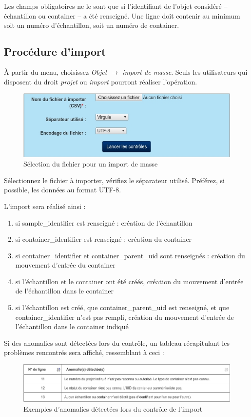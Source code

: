 Les champs obligatoires ne le sont que si l'identifiant de l'objet considéré -- échantillon ou container -- a été renseigné. Une ligne doit contenir au minimum soit un numéro d'échantillon, soit un numéro de container.

\subsection{Procédure d'import}

À partir du menu, choisissez \textit{Objet $\rightarrow$ import de masse}. Seuls les utilisateurs qui disposent du droit \textit{projet} ou \textit{import} pourront réaliser l'opération.
\begin{figure}[H]
\includegraphics[width=\linewidth]{images/import_controle}
\caption{Sélection du fichier pour un import de masse}
\end{figure}

Sélectionnez le fichier à importer, vérifiez le séparateur utilisé. Préférez, si possible, les données au format UTF-8.

L'import sera réalisé ainsi :
\begin{enumerate}

\item  si sample\_identifier est renseigné : création de l'échantillon
\item    si container\_identifier est renseigné : création du container
\item    si container\_identifier et container\_parent\_uid sont renseignés : création du mouvement d'entrée du container
\item    si l'échantillon et le container ont été créés, création du mouvement d'entrée de l'échantillon dans le container
\item    si l'échantillon est créé, que container\_parent\_uid est renseigné, et que container\_identifier n'est pas rempli, création du mouvement d'entrée de l'échantillon dans le container indiqué

\end{enumerate}

Si des anomalies sont détectées lors du contrôle, un tableau récapitulant les problèmes rencontrés sera affiché, ressemblant à ceci :
\begin{figure}[H]
\includegraphics[width=\linewidth]{images/import_tableau}
\caption{Exemples d'anomalies détectées lors du contrôle de l'import}
\end{figure}

